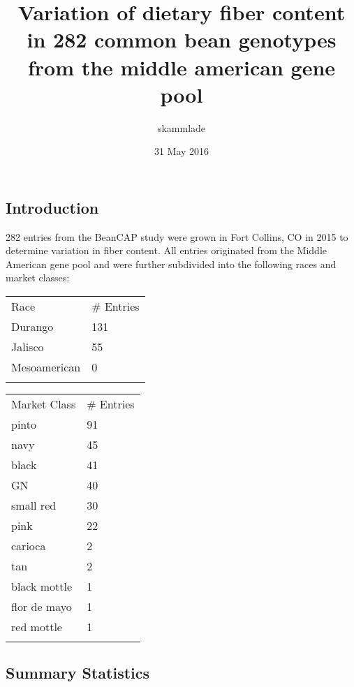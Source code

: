 \documentclass[12pt,]{article}
\title{Variation of dietary fiber content in 282 common bean genotypes from the
middle american gene pool}
\author{skammlade}
\date{31 May 2016}
\begin{document}
\maketitle


{
\hypersetup{linkcolor=black}
\setcounter{tocdepth}{2}
\tableofcontents
}
\subsection{Introduction}\label{introduction}

282 entries from the BeanCAP study were grown in Fort Collins, CO in
2015 to determine variation in fiber content. All entries originated
from the Middle American gene pool and were further subdivided into the
following races and market classes:

\begin{longtable}[c]{@{}ll@{}}
\toprule\addlinespace
Race & \# Entries
\\\addlinespace
\midrule\endhead
Durango & 131
\\\addlinespace
Jalisco & 55
\\\addlinespace
Mesoamerican & 0
\\\addlinespace
\bottomrule
\end{longtable}

\begin{longtable}[c]{@{}ll@{}}
\toprule\addlinespace
Market Class & \# Entries
\\\addlinespace
\midrule\endhead
pinto & 91
\\\addlinespace
navy & 45
\\\addlinespace
black & 41
\\\addlinespace
GN & 40
\\\addlinespace
small red & 30
\\\addlinespace
pink & 22
\\\addlinespace
carioca & 2
\\\addlinespace
tan & 2
\\\addlinespace
black mottle & 1
\\\addlinespace
flor de mayo & 1
\\\addlinespace
red mottle & 1
\\\addlinespace
\bottomrule
\end{longtable}

\subsection{Summary Statistics}\label{summary-statistics}
\end{document}
